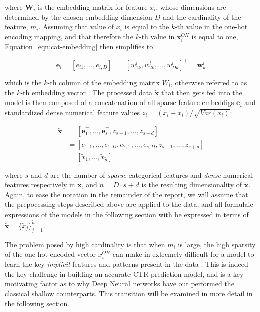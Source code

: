 \documentclass{mldsmsc}
\begin{document}
where $\mathbf{W}_i$ is the embedding matrix for feature $x_i$, whose dimensions are determined
by the chosen embedding dimension $D$ and the cardinality of the feature, $m_i$. Assuming
that value of $x_i$ is equal to the $k$-th value in the one-hot encoding mapping, and that therefore
the $k$-th value in $\mathbf{x}_i^{OH}$ is equal to one, Equation~\ref{eqn:cat-embedding} then simplifies
to

\begin{equation}
    \mathbf{e}_i = \left[e_{i 1}, \ldots, e_{i, D} \right]^{\intercal}
    = \left[w_{1 k}^{i}, w_{2 k}^{i}, \ldots , w_{D k}^{i}\right]^{\intercal} = \mathbf{w}_{k}^{i}
\end{equation}

which is the $k$-th column of the embedding matrix $W_i$, otherwise referred to as the $k$-th
embedding vector \citep{RefWorks:hancock2020survey}. The processed data $\tilde{\mathbf{x}}$ that then gets fed into the model is 
then composed of a concatenation of all sparse feature embeddigs $\mathbf{e}_i$ and standardized
dense numerical feature values
$z_i = (x_i - \bar{x_i})/\sqrt{Var(x_i)}$:

\begin{equation}
    \begin{split}
    \tilde{\mathbf{x}} &= \left[ \mathbf{e}_1^{\intercal}, \dots , \mathbf{e}_s^{\intercal}, z_{s+1}, \dots , z_{s+d} \right]\\
    &= \left[e_{1, 1}, \ldots, e_{1 ,D}, e_{2, 1}, \ldots , e_{s, D}, z_{s+1}, \ldots, z_{s+d}\right]\\
    &= \left[ \tilde{x}_1, \ldots, \tilde{x}_{\tilde{n}}\right]
    \end{split}
\end{equation}

where $s$ and $d$ are the number of \emph{sparse} categorical features and \emph{dense}
numerical features respectively in $\mathbf{x}$, and $\tilde{n} = D\cdot s + d$
is the resulting dimensionality of $\tilde{\mathbf{x}}$. Again, to ease the notation in the
remainder of the report, we will assume that the prepocessing steps described above
are applied to the data, and all formulaic expressions of the models in the following
section with be expressed in terms of $\tilde{\mathbf{x}} = \{\tilde{x}_j\}_{j=1}^{\tilde{n}}$.

The problem posed by high cardinality is that when $m_i$ is large, the high
sparsity of the one-hot encoded vector $x_i^{OH}$ can make in extremely difficult
for a model to learn the key \emph{implicit} features and patterns present in the
data \citep{RefWorks:gu2021ad}. This is indeed the key challenge in building an
accurate CTR prediction model, and is a key motivating factor as to why Deep Neural
networks have out performed the classical shallow counterparts. This transition will be examined
in more detail in the following section.
\end{document}
